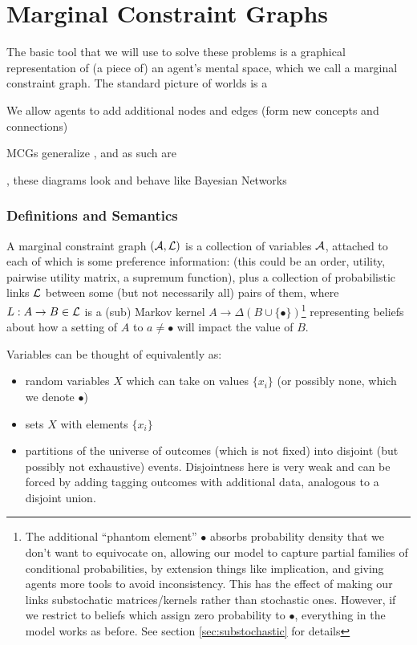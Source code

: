 \documentclass{article}
\begin{document}
	\clearpage
	\part{Marginal Constraint Graphs}
	The basic tool that we will use to solve these problems is a graphical representation of (a piece of) an agent's mental space, which we call a marginal constraint graph. The standard picture of worlds is a 
	
	We allow agents to add additional nodes and edges (form new concepts and connections)
	
	MCGs generalize , and as such are 
	
, these diagrams look and behave like Bayesian Networks
	
	\section*{Definitions and Semantics}
	\begin{defn*}
		A marginal constraint graph $(\cal A, L)$ is a collection of variables $\cal A$, attached to each of which is some preference information: (this could be an order, utility, pairwise utility matrix, a supremum function), plus a collection of probabilistic links $\cal L$ between some (but not necessarily all) pairs of them, where $L: A\to B \in \cal L$ is a (sub) Markov kernel $A \to \Delta (B \cup \{\bullet\})$\footnote{The additional ``phantom element'' $\bullet$ absorbs probability density that we don't want to equivocate on, allowing our model to capture partial families of conditional probabilities, by extension things like implication, and giving agents more tools to avoid inconsistency. This has the effect of making our links substochatic matrices/kernels rather than stochastic ones. However, if we restrict to beliefs which assign zero probability to $\bullet$, everything in the model works as before. See section \ref{sec:substochastic} for details} representing beliefs about how a setting of $A$ to $a \neq \bullet$ will impact the value of $B$. 
	\end{defn*}
	
	Variables can be thought of equivalently as:
	\begin{itemize}[nosep]
		\item random variables $X$ which can take on values $\{x_i\}$ (or possibly none, which we denote $\bullet$)
		\item sets $X$ with elements $\{x_i\}$
		\item partitions of the universe of outcomes (which is not fixed) into disjoint (but possibly not exhaustive) events. Disjointness here is very weak and can be forced by adding tagging outcomes with additional data, analogous to a disjoint union.
	\end{itemize}
	
\end{document}
